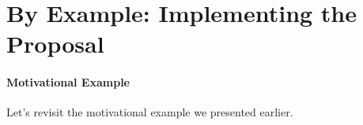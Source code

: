 \section{By Example: Implementing the Proposal}\label{sec:by_example_implementing_the_proposal}


\begin{frame}{\secname}
	\framesubtitle{Motivational Example}

	Let's revisit the motivational example we presented earlier.

	\begin{overprint}
		\begin{figure}[h!]
		\end{figure}

		\begin{figure}[h!]
		\end{figure}

		\begin{figure}[h!]
		\end{figure}
	\end{overprint}

\end{frame}

